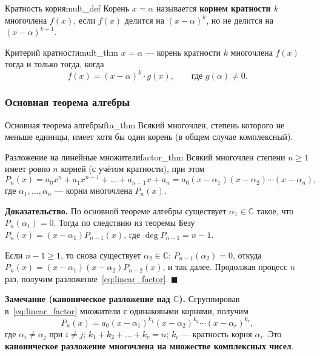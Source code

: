 \documentclass[12pt,a4paper]{article}
\newenvironment{myproof}{\noindent\textbf{Доказательство.}}{\hfill$\blacksquare$}
\begin{document}
\begin{definition}{Кратность корня}{mult_def}
Корень $x = \alpha$ называется \textbf{корнем кратности $k$}
многочлена $f(x)$, если $f(x)$ делится на $(x - \alpha)^k$, но не
делится на $(x - \alpha)^{k+1}$.
\end{definition}

\begin{theorem}{Критерий кратности}{mult_thm}
$x = \alpha$ — корень кратности $k$ многочлена $f(x)$ тогда и только
тогда, когда
\[
f(x) = (x - \alpha)^k \cdot g(x), \qquad \text{где } g(\alpha) \neq 0.
\]
\end{theorem}

\subsubsection*{Основная теорема алгебры}

\begin{theorem}{Основная теорема алгебры}{fta_thm}
Всякий многочлен, степень которого не меньше единицы, имеет хотя бы
один корень (в общем случае комплексный).
\end{theorem}

\begin{theorem}{Разложение на линейные множители}{factor_thm}
Всякий многочлен степени $n \ge 1$ имеет ровно $n$ корней (с учётом
кратности), при этом
\begin{equation}
P_n(x) = a_0 x^n + a_1 x^{n-1} + \dots + a_{n-1} x + a_n
= a_0 (x - \alpha_1)(x - \alpha_2)\cdots(x - \alpha_n),
\tag{13.4} \label{eq:linear_factor}
\end{equation}
где $\alpha_1, \dots, \alpha_n$ — корни многочлена $P_n(x)$.
\end{theorem}

\begin{myproof}
По основной теореме алгебры существует $\alpha_1 \in \mathbb{C}$
такое, что $P_n(\alpha_1) = 0$. Тогда по следствию из теоремы Безу
$P_n(x) = (x - \alpha_1) P_{n-1}(x)$, где $\deg P_{n-1} = n - 1$.

Если $n - 1 \ge 1$, то снова существует $\alpha_2 \in \mathbb{C}$:
$P_{n-1}(\alpha_2) = 0$, откуда
$P_n(x) = (x - \alpha_1)(x - \alpha_2) P_{n-2}(x)$, и так далее.
Продолжая процесс $n$ раз, получим разложение~\eqref{eq:linear_factor}.
\end{myproof}

\noindent\textbf{Замечание (каноническое разложение над
$\mathbb{C}$).} Сгруппировав в~\eqref{eq:linear_factor} множители с
одинаковыми корнями, получим
\begin{equation}
P_n(x) = a_0 (x - \alpha_1)^{k_1}(x - \alpha_2)^{k_2}
\cdots (x - \alpha_r)^{k_r},
\tag{13.5} \label{eq:canonical_C}
\end{equation}
где $\alpha_i \neq \alpha_j$ при $i \neq j$;
$k_1 + k_2 + \dots + k_r = n$; $k_i$ — кратность корня $\alpha_i$.
Это \textbf{каноническое разложение многочлена на множестве
комплексных чисел}.
\end{document}
